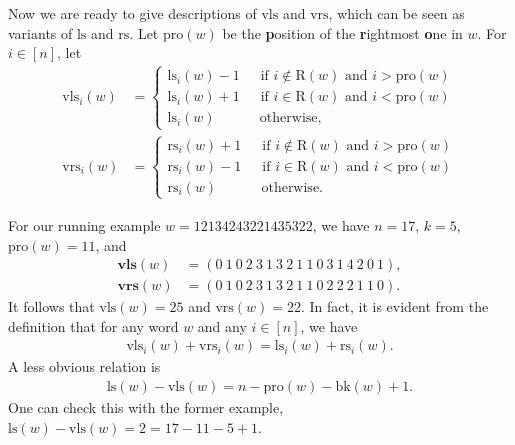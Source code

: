 \documentclass[12pt]{amsart}
\numberwithin{equation}{section}
\theoremstyle{plain}
\theoremstyle{definition}
\def\bk{\mathrm{bk}}
\def\ls{\mathrm{ls}}
\def\rs{\mathrm{rs}}
\def\wrs{\mathrm{vrs}}
\def\wls{\mathrm{vls}}
\def\tail{\mathrm{tail}}
\def\pl{\mathrm{pro}}
\def\RR{\mathrm{R}}
\def\bwls{\mathbf{vls}}
\def\bwrs{\mathbf{vrs}}
\def\RG{\mathcal{RG}}
\begin{document}
Now we are ready to give descriptions of $\wls$ and $\wrs$, which can be seen as variants of $\ls$ and $\rs$.
Let $\pl(w)$ be the {\bf p}osition of the {\bf r}ightmost {\bf o}ne in $w$.
For $i \in [n]$, let
\begin{align*}
  \wls_i(w)&=\left\{
  \begin{array}{ll}
\ls_i(w)-1  \,\,\,\,\,\,\,\,\,  \mbox{if $i \notin \RR(w)$ and $i > \pl(w)$}\\[5pt]
\ls_i(w)+1  \,\,\,\,\,\,\,\,\,\mbox{if $i \in \RR(w)$ and $i < \pl(w)$}\\[5pt]
\ls_i(w)  \,\,\,\,\,\,\,\,\,\,\,\,\,\,\,\,\,\,\,  \mbox{otherwise,}
 \end{array} \right. \\[5pt]
   \wrs_i(w)&=\left\{
  \begin{array}{ll}
\rs_i(w)+1  \,\,\,\,\,\,\,\,\,  \mbox{if $i \notin \RR(w)$ and $i > \pl(w)$}\\[5pt]
\rs_i(w)-1  \,\,\,\,\,\,\,\,\,\mbox{if $i \in \RR(w)$ and $i < \pl(w)$}\\[5pt]
\rs_i(w)  \,\,\,\,\,\,\,\,\,\,\,\,\,\,\,\,\,\,\,  \mbox{otherwise.}
 \end{array} \right.
\end{align*}


For our running example $w=12134243221435322$, we have $n=17$, $k=5$, $\pl(w)=11$, and
\begin{align*}
  \bwls(w)&= (0~1~0~2~3~1~3~2~1~1~0~3~1~4~2~0~1), \\[5pt]
  \bwrs(w)&= (0~1~0~2~3~1~3~2~1~1~0~2~2~2~1~1~0).
\end{align*}
It follows that $\wls(w)=25$ and $\wrs(w)=22$.
In fact, it is evident from the definition that for any word $w$ and any $i\in[n]$, we have
\begin{align}\label{wls+wrs}
\wls_i(w)+\wrs_i(w)=\ls_i(w)+\rs_i(w).
\end{align}
A less obvious relation is
\begin{align}\label{def-wls}
\ls(w)-\wls(w)=n-\pl(w)-\bk(w)+1.
\end{align}
One can check this with the former example, $\ls(w)-\wls(w)=2=17-11-5+1$.
\end{document}
